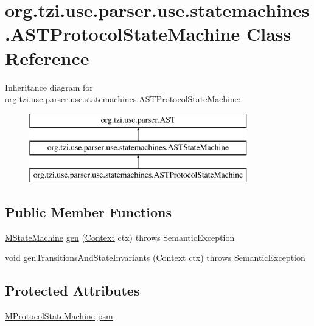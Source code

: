 \hypertarget{classorg_1_1tzi_1_1use_1_1parser_1_1use_1_1statemachines_1_1_a_s_t_protocol_state_machine}{\section{org.\-tzi.\-use.\-parser.\-use.\-statemachines.\-A\-S\-T\-Protocol\-State\-Machine Class Reference}
\label{classorg_1_1tzi_1_1use_1_1parser_1_1use_1_1statemachines_1_1_a_s_t_protocol_state_machine}
}
Inheritance diagram for org.\-tzi.\-use.\-parser.\-use.\-statemachines.\-A\-S\-T\-Protocol\-State\-Machine\-:\begin{figure}[H]
\begin{center}
\leavevmode
\includegraphics[height=3.000000cm]{classorg_1_1tzi_1_1use_1_1parser_1_1use_1_1statemachines_1_1_a_s_t_protocol_state_machine}
\end{center}
\end{figure}
\subsection*{Public Member Functions}
\begin{DoxyCompactItemize}
\item 
\hyperlink{classorg_1_1tzi_1_1use_1_1uml_1_1mm_1_1statemachines_1_1_m_state_machine}{M\-State\-Machine} \hyperlink{classorg_1_1tzi_1_1use_1_1parser_1_1use_1_1statemachines_1_1_a_s_t_protocol_state_machine_a10605aa6e19a2c6da08c7e9c3df7ef2f}{gen} (\hyperlink{classorg_1_1tzi_1_1use_1_1parser_1_1_context}{Context} ctx)  throws Semantic\-Exception 
\item 
void \hyperlink{classorg_1_1tzi_1_1use_1_1parser_1_1use_1_1statemachines_1_1_a_s_t_protocol_state_machine_af75ef1c9e2d470f15b910366681b732f}{gen\-Transitions\-And\-State\-Invariants} (\hyperlink{classorg_1_1tzi_1_1use_1_1parser_1_1_context}{Context} ctx)  throws Semantic\-Exception 
\end{DoxyCompactItemize}
\subsection*{Protected Attributes}
\begin{DoxyCompactItemize}
\item 
\hyperlink{classorg_1_1tzi_1_1use_1_1uml_1_1mm_1_1statemachines_1_1_m_protocol_state_machine}{M\-Protocol\-State\-Machine} \hyperlink{classorg_1_1tzi_1_1use_1_1parser_1_1use_1_1statemachines_1_1_a_s_t_protocol_state_machine_a3903a29c66c7b384425443c42bd1b302}{psm}
\end{DoxyCompactItemize}


